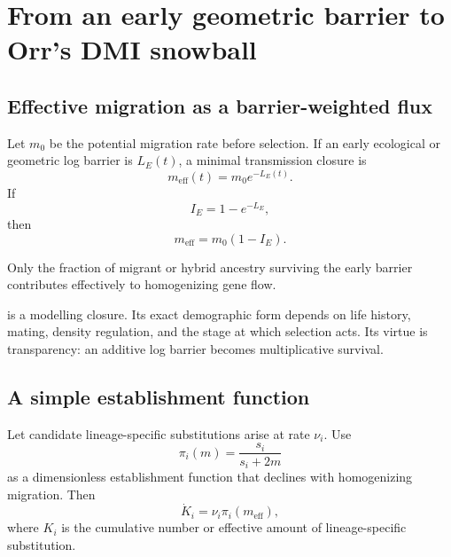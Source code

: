 \chapter{From an early geometric barrier to Orr's DMI snowball}

\section{Effective migration as a barrier-weighted flux}

Let \(m_0\) be the potential migration rate before selection. If an early ecological or geometric log barrier is \(L_E(t)\), a minimal transmission closure is
\begin{equation}
\boxed{
m_{\mathrm{eff}}(t)=m_0e^{-L_E(t)}.}
\label{eq:effectiveMigration}
\end{equation}
If
\begin{equation}
I_E=1-e^{-L_E},
\end{equation}
then
\begin{equation}
m_{\mathrm{eff}}=m_0(1-I_E).
\end{equation}

\inwords Only the fraction of migrant or hybrid ancestry surviving the early barrier contributes effectively to homogenizing gene flow.

\begin{cautionbox}
 is a modelling closure. Its exact demographic form depends on life history, mating, density regulation, and the stage at which selection acts. Its virtue is transparency: an additive log barrier becomes multiplicative survival.
\end{cautionbox}

\section{A simple establishment function}

Let candidate lineage-specific substitutions arise at rate \(\nu_i\). Use
\begin{equation}
\pi_i(m)=\frac{s_i}{s_i+2m}
\label{eq:establishmentClosure}
\end{equation}
as a dimensionless establishment function that declines with homogenizing migration. Then
\begin{equation}
\boxed{
\dot K_i=\nu_i\pi_i(m_{\mathrm{eff}}),}
\label{eq:substitutionAccumulation}
\end{equation}
where \(K_i\) is the cumulative number or effective amount of lineage-specific substitution.

